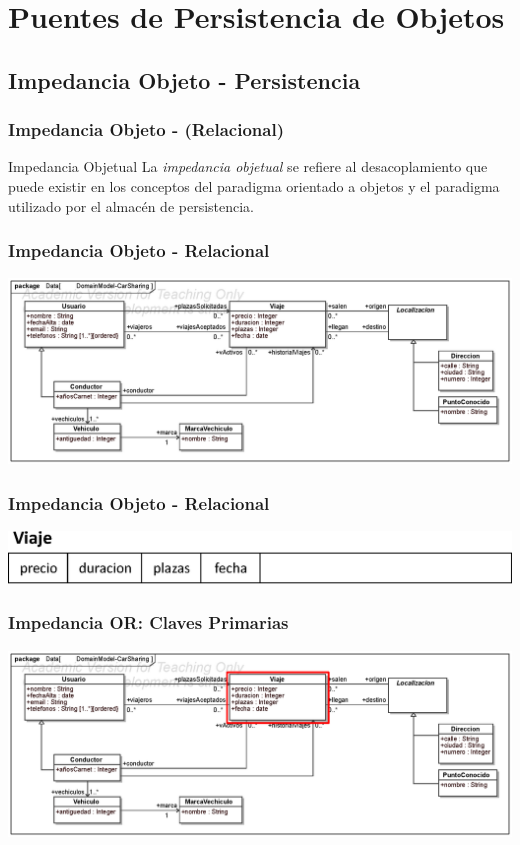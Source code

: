 \documentclass[a4paper,slidestop,xcolor=pst,blue]{beamer}
\begin{document}
\section{Puentes de Persistencia de Objetos}

\subsection{Impedancia Objeto - Persistencia}

\begin{frame}[c]
    \frametitle{Impedancia Objeto - (Relacional)}
    \begin{block}{Impedancia Objetual}
    La \emph{impedancia objetual} se refiere al desacoplamiento que puede existir en los conceptos del paradigma orientado a objetos y el paradigma utilizado por el almacén de persistencia.
    \end{block}
\end{frame}

\begin{frame}[c]
    \frametitle{Impedancia Objeto - Relacional}
    \begin{center}
        \includegraphics[width=\linewidth]{images/ooMismatch/ooMismatch00.eps}
    \end{center}
\end{frame}

\begin{frame}[c]
    \frametitle{Impedancia Objeto - Relacional}
    \begin{center}
        \includegraphics[width=0.8\linewidth]{images/ooMismatch/ooMismatch01.eps}
    \end{center}
\end{frame}

\begin{frame}[c]
    \frametitle{Impedancia OR: Claves Primarias}
    \begin{center}
        \includegraphics[width=\linewidth]{images/ooMismatch/ooMismatch09.eps}
    \end{center}
\end{frame}
\end{document}
